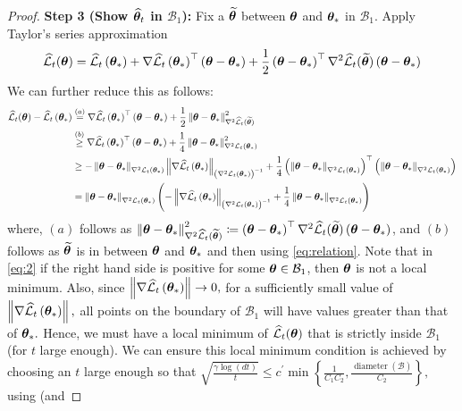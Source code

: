 \begin{proof}
\textbf{Step 3 (Show ${\widehat{\bm{\theta}}}_t$ in $\mathcal{B}_1$):} Fix a $\widetilde{\bm{\theta}}$ between $\bm{\theta}$ and $\bm{\theta}_*$ in $\mathcal{B}_1$. Apply Taylor's series approximation
\begin{align*}
    \widehat{\cal L}_{t}(\bm{\theta})=\widehat{\cal L}_{t}\left(\bm{\theta}_{*}\right)+\nabla \widehat{\cal L}_{t}\left(\bm{\theta}_{*}\right)^{\top}\left(\bm{\theta}-\bm{\theta}_{*}\right)+\frac{1}{2}\left(\bm{\theta}-\bm{\theta}_{*}\right)^{\top} \nabla^{2} \widehat{\cal L}_{t}(\widetilde{\bm{\theta}})\left(\bm{\theta}-\bm{\theta}_{*}\right)
\end{align*}
We can further reduce this as follows:
\begin{align}
\widehat{\cal L}_{t}(\bm{\theta})-\widehat{\cal L}_{t}\left(\bm{\theta}_{*}\right) &\overset{(a)}{=}\nabla \widehat{\cal L}_{t}\left(\bm{\theta}_{*}\right)^{\top}\left(\bm{\theta}-\bm{\theta}_{*}\right)+\frac{1}{2}\left\|\bm{\theta}-\bm{\theta}_{*}\right\|_{\nabla^{2} \widehat{\cal L}_t(\widetilde{\bm{\theta}})}^{2} \nonumber\\
& \overset{(b)}{\geq} \nabla \widehat{\cal L}_{t}\left(\bm{\theta}_{*}\right)^{\top}\left(\bm{\theta}-\bm{\theta}_{*}\right)+\frac{1}{4}\left\|\bm{\theta}-\bm{\theta}_{*}\right\|_{\nabla^{2} {\cal L}_{t}\left(\bm{\theta}_{*}\right)}^{2} \nonumber\\
&\geq -\left\|\bm{\theta}-\bm{\theta}_{*}\right\|_{\nabla^{2} {\cal L}_{t}\left(\bm{\theta}_{*}\right)}\left\|\nabla \widehat{\cal L}_{t}\left(\bm{\theta}_{*}\right)\right\|_{\left(\nabla^{2} {\cal L}_{t}\left(\bm{\theta}_{*}\right)\right)^{-1}} + \frac{1}{4}\left(\left\|\bm{\theta}-\bm{\theta}_{*}\right\|_{\nabla^{2} {\cal L}_{t}\left(\bm{\theta}_{*}\right)}\right)^{\top}\left(\left\|\bm{\theta}-\bm{\theta}_{*}\right\|_{\nabla^{2} {\cal L}_{t}\left(\bm{\theta}_{*}\right)}\right)\nonumber\\
& =\left\|\bm{\theta}-\bm{\theta}_{*}\right\|_{\nabla^{2} {\cal L}_{t}\left(\bm{\theta}_{*}\right)}\left(-\left\|\nabla \widehat{\cal L}_{t}\left(\bm{\theta}_{*}\right)\right\|_{\left(\nabla^{2} {\cal L}_{t}\left(\bm{\theta}_{*}\right)\right)^{-1}}+\frac{1}{4}\left\|\bm{\theta}-\bm{\theta}_{*}\right\|_{\nabla^{2} {\cal L}_{t}\left(\bm{\theta}_{*}\right)}\right) \label{eq:2}
\end{align}
where, $(a)$ follows as $\left\|\bm{\theta}-\bm{\theta}_{*}\right\|_{\nabla^{2} \widehat{\cal L}_t(\widetilde{\bm{\theta}})}^{2}\coloneqq \left(\bm{\theta}-\bm{\theta}_{*}\right)^{\top} \nabla^{2} \widehat{\cal L}_{t}(\widetilde{\bm{\theta}})\left(\bm{\theta}-\bm{\theta}_{*}\right)$, and $(b)$ follows as $\widetilde{\bm{\theta}}$ is in between $\bm{\theta}$ and $\bm{\theta}_*$ and then using \eqref{eq:relation}. 
Note that in \eqref{eq:2} if the right hand side is positive for some $\bm{\theta} \in \mathcal{B}_{1}$, then $\bm{\theta}$ is not a local minimum. Also, since $\left\|\nabla \widehat{\cal L}_{t}\left(\bm{\theta}_{*}\right)\right\| \rightarrow 0,$ for a sufficiently small value of $\left\|\nabla \widehat{\cal L}_{t}\left(\bm{\theta}_{*}\right)\right\|,$ all points on the boundary of $\mathcal{B}_{1}$ will have values greater than that of $\bm{\theta}_{*} .$ Hence, we must have a local minimum of $\widehat{\cal L}_{t}(\bm{\theta})$ that is strictly inside $\mathcal{B}_{1}$ (for $t$ large enough). We can ensure this local minimum condition is achieved by choosing an $t$ large enough so that $\sqrt{\frac{\gamma \log (dt)}{t}} \leq c^{\prime} \min \left\{\frac{1}{C_{1}C_{2} }, \frac{\operatorname{diameter}(\mathcal{B})}{C_{2}}\right\},$ using  (and

\end{proof}
